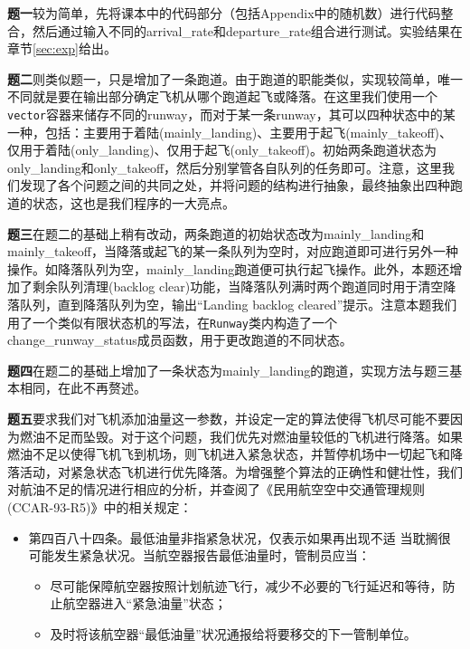 \documentclass[12pt,UTF8]{ctexart}
\begin{document}
\begin{spacing}{1.4}
	\textbf{题一}较为简单，先将课本中的代码部分（包括Appendix中的随机数）进行代码整合，然后通过输入不同的arrival\_rate和departure\_rate组合进行测试。实验结果在章节\ref{sec:exp}给出。
	
	\textbf{题二}则类似题一，只是增加了一条跑道。由于跑道的职能类似，实现较简单，唯一不同就是要在输出部分确定飞机从哪个跑道起飞或降落。在这里我们使用一个\verb'vector'容器来储存不同的runway，而对于某一条runway，其可以四种状态中的某一种，包括：主要用于着陆(mainly\_landing)、主要用于起飞(mainly\_takeoff)、仅用于着陆(only\_landing)、仅用于起飞(only\_takeoff)。初始两条跑道状态为only\_landing和only\_takeoff，然后分别掌管各自队列的任务即可。注意，这里我们发现了各个问题之间的共同之处，并将问题的结构进行抽象，最终抽象出四种跑道的状态，这也是我们程序的一大亮点。
	
	\textbf{题三}在题二的基础上稍有改动，两条跑道的初始状态改为mainly\_landing和mainly\_takeoff，当降落或起飞的某一条队列为空时，对应跑道即可进行另外一种操作。如降落队列为空，mainly\_landing跑道便可执行起飞操作。此外，本题还增加了剩余队列清理(backlog clear)功能，当降落队列满时两个跑道同时用于清空降落队列，直到降落队列为空，输出``Landing backlog cleared''提示。注意本题我们用了一个类似有限状态机的写法，在\verb'Runway'类内构造了一个change\_runway\_status成员函数，用于更改跑道的不同状态。
	
	\textbf{题四}在题二的基础上增加了一条状态为mainly\_landing的跑道，实现方法与题三基本相同，在此不再赘述。
	
	\textbf{题五}要求我们对飞机添加油量这一参数，并设定一定的算法使得飞机尽可能不要因为燃油不足而坠毁。对于这个问题，我们优先对燃油量较低的飞机进行降落。如果燃油不足以使得飞机飞到机场，则飞机进入紧急状态，并暂停机场中一切起飞和降落活动，对紧急状态飞机进行优先降落。为增强整个算法的正确性和健壮性，我们对航油不足的情况进行相应的分析，并查阅了《民用航空空中交通管理规则 (CCAR-93-R5)》中的相关规定：
	\begin{itemize}
		\item 第四百八十四条。最低油量非指紧急状况，仅表示如果再出现不适 当耽搁很可能发生紧急状况。当航空器报告最低油量时，管制员应当：
		\begin{itemize}
			\item 尽可能保障航空器按照计划航迹飞行，减少不必要的飞行延迟和等待，防止航空器进入``紧急油量''状态；
			\item 及时将该航空器``最低油量''状况通报给将要移交的下一管制单位。
		\end{itemize}
	\end{itemize}


\end{spacing}
\end{document}
